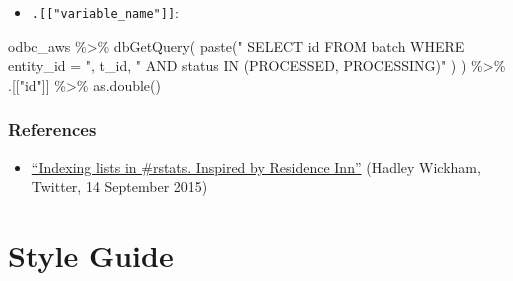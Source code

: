 \documentclass[
]{book}
\newenvironment{Shaded}{\begin{snugshade}}{\end{snugshade}}
\newcommand{\FunctionTok}[1]{\textcolor[rgb]{0.00,0.00,0.00}{#1}}
\newcommand{\NormalTok}[1]{#1}
\newcommand{\OtherTok}[1]{\textcolor[rgb]{0.56,0.35,0.01}{#1}}
\newcommand{\SpecialCharTok}[1]{\textcolor[rgb]{0.00,0.00,0.00}{#1}}
\newcommand{\StringTok}[1]{\textcolor[rgb]{0.31,0.60,0.02}{#1}}
\providecommand{\tightlist}{%
  \setlength{\itemsep}{0pt}\setlength{\parskip}{0pt}}
\begin{document}
\begin{Shaded}
\end{Shaded}

\begin{itemize}
\tightlist
\item
  \texttt{.{[}{[}"variable\_name"{]}{]}}:
\end{itemize}

\begin{Shaded}
\begin{Highlighting}[]
\NormalTok{odbc\_aws }\SpecialCharTok{\%\textgreater{}\%} 
  \FunctionTok{dbGetQuery}\NormalTok{(}
    \FunctionTok{paste}\NormalTok{(}\StringTok{"}
\StringTok{          SELECT id}
\StringTok{          FROM batch}
\StringTok{          WHERE entity\_id = "}\NormalTok{, t\_id, }\StringTok{"}
\StringTok{          AND status IN (\textquotesingle{}PROCESSED\textquotesingle{}, \textquotesingle{}PROCESSING\textquotesingle{})"}
\NormalTok{    )}
\NormalTok{  ) }\SpecialCharTok{\%\textgreater{}\%} 
\NormalTok{  .[[}\StringTok{"id"}\NormalTok{]] }\SpecialCharTok{\%\textgreater{}\%} 
\FunctionTok{as.double}\NormalTok{()}
\end{Highlighting}
\end{Shaded}

\hypertarget{references-1}{%
\subsubsection{References}\label{references-1}}

\begin{itemize}
\tightlist
\item
  \href{https://twitter.com/hadleywickham/status/643381054758363136}{``Indexing lists in \#rstats. Inspired by Residence Inn''} (Hadley Wickham, Twitter, 14 September 2015)
\end{itemize}

\hypertarget{style-guide}{%
\section{Style Guide}\label{style-guide}}
\end{document}
